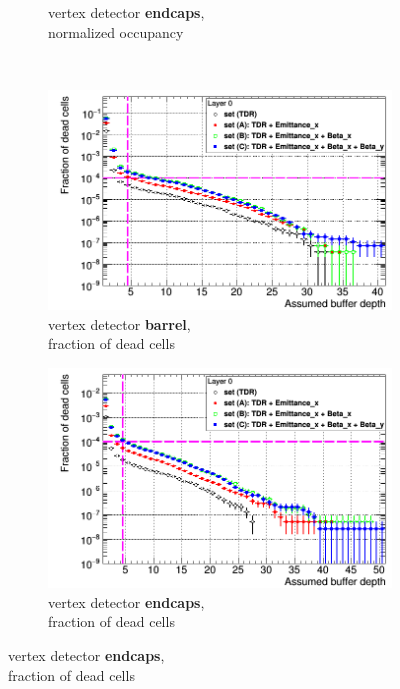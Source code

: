 \begin{figure}
\begin{subfigure}[b]{0.49\textwidth}
   \caption{\sid vertex detector \textbf{endcaps},\\normalized occupancy}
   \end{subfigure}\\
    \begin{subfigure}[b]{0.49\textwidth}
   \centering
    \includegraphics[width=\textwidth]{Figures/Pairs/Occupancy_Comparison_Layer_0_deadcells_ILC250_ALL_SETS_SiVertexBarrel_corrected_Barrel_size.png}
   \caption{\sid vertex detector \textbf{barrel},\\fraction of dead cells}
   \end{subfigure}
   \hfill
    \begin{subfigure}[b]{0.49\textwidth}
   \centering
    \includegraphics[width=\textwidth]{Figures/Pairs/Occupancy_Comparison_Layer_0_deadcells_ILC250_ALL_SETS_5T_w_antiDiD_SiVertexEndcap.png}
   \caption{\sid vertex detector \textbf{endcaps},\\fraction of dead cells}

\end{subfigure}
\end{figure}
